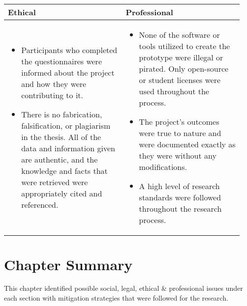 \begin{longtable}{|p{0.473\linewidth}|p{0.473\linewidth}|}
\textbf{Ethical} & \textbf{Professional} \\ 
\hline
\vspace{-7mm}       %
\begin{itemize}[leftmargin=*]
\item Participants who completed the questionnaires were informed about the project and how they were contributing to it.
\item There is no fabrication, falsification, or plagiarism in the thesis. All of the data and information given are authentic, and the knowledge and facts that were retrieved were appropriately cited and referenced.
\vspace{-7mm}       %
\end{itemize}
& 
\vspace{-7mm}       %
\begin{itemize}[leftmargin=*]
\item None of the software or tools utilized to create the prototype were illegal or pirated. Only open-source or student licenses were used throughout the process.
\item The project's outcomes were true to nature and were documented exactly as they were without any modifications.
\item A high level of research standards were followed throughout the research process.
\vspace{-7mm}       %
\end{itemize}
\\
\hline
\end{longtable}


\section{Chapter Summary}
This chapter identified possible social, legal, ethical \& professional issues under each section with mitigation strategies that were followed for the research.